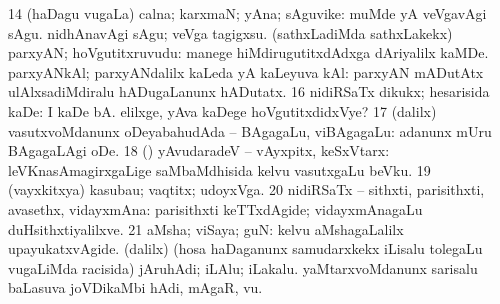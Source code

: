 {\num{14} (haDagu \mo vugaLa) calna; karxmaN; yAna; sAguvike:  muMde yA veVgavAgi sAgu.  nidhAnavAgi sAgu; veVga tagigxsu. 
\banum
{} (sathxLadiMda sathxLakekx) parxyAN; hoVgutitxruvudu:  manege hiMdirugutitxdAdxga dAriyalilx kaMDe. 
 parxyANkAl; parxyANdalilx kaLeda yA kaLeyuva kAl:  parxyAN mADutAtx ulAlxsadiMdiralu hADugaLanunx hADutatx. 
\eanum
\numie
\num{16} nidiRSaTx dikukx; hesarisida kaDe:  I kaDe bA.  elilxge, yAva kaDege hoVgutitxdidxVye? 
\num{17} (\bava dalilx) vasutxvoMdanunx oDeyabahudAda -- BAgagaLu, viBAgagaLu:  adanunx mUru BAgagaLAgi oDe. 
\num{18} (\AmA) yAvudaradeV -- vAyxpitx, keSxVtarx:  leVKnasAmagirxgaLige saMbaMdhisida kelvu vasutxgaLu beVku. 
\num{19} (vayxkitxya) kasubau; vaqtitx; udoyxVga. 
\num{20} nidiRSaTx -- sithxti, parisithxti, avasethx, vidayxmAna:  parisithxti keTTxdAgide; vidayxmAnagaLu duHsithxtiyalilxve. 
\num{21} aMsha; viSaya; guN:  kelvu aMshagaLalilx upayukatxvAgide. 
 (\bava dalilx) 
\banum
{} (hosa haDaganunx samudarxkekx iLisalu tolegaLu \mo vugaLiMda racisida) jAruhAdi; iLAlu; iLakalu. 
 yaMtarxvoMdanunx sarisalu baLasuva joVDikaMbi hAdi, mAgaR, \mo vu. 
\eanum
\numie
\enum
\emng

}

